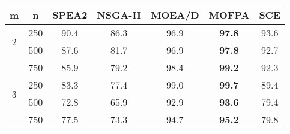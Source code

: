 \begin{tabular}{cc|c|c|c|c|c}
  \hline
  { m} &
  { n} &
  { SPEA2} &
  { NSGA-II} &
  { MOEA/D} &
  { MOFPA} &
  { SCE} \\ \hline
  \multirow{2}{*}{2} & { 250} & 90.4 & 86.3 & 96.9 & \textbf{97.8} & 93.6 \\ \cline{2-7}
   & { 500} & 87.6 & 81.7 & 96.9 & \textbf{97.8} & 92.7 \\ \cline{2-7}
   & { 750} & 85.9 & 79.2 & 98.4 & \textbf{99.2} & 92.3 \\ \hline
  \multirow{2}{*}{3} & { 250} & 83.3 & 77.4 & 99.0 & \textbf{99.7} & 89.4 \\ \cline{2-7}
   & { 500} & 72.8 & 65.9 & 92.9 & \textbf{93.6} & 79.4 \\ \cline{2-7}
   & { 750} & 77.5 & 73.3 & 94.7 & \textbf{95.2} & 79.8 \\ \hline
\end{tabular}
